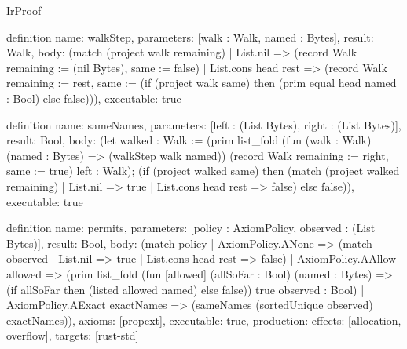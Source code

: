 \begin{lexlean}{IrProof}
\begin{semanticmodule}
definition{
  name: walkStep,
  parameters: [walk : Walk, named : Bytes],
  result: Walk,
  body: (match (project walk remaining)
    | List.nil => (record Walk {remaining := (nil Bytes), same := false})
    | List.cons head rest => (record Walk {remaining := rest, same := (if (project walk same) then (prim equal head named : Bool) else false)})),
  executable: true
}

definition{
  name: sameNames,
  parameters: [left : (List Bytes), right : (List Bytes)],
  result: Bool,
  body: (let walked : Walk := (prim list_fold (fun (walk : Walk) (named : Bytes) => (walkStep walk named)) (record Walk {remaining := right, same := true}) left : Walk); (if (project walked same) then (match (project walked remaining)
    | List.nil => true
    | List.cons head rest => false) else false)),
  executable: true
}

definition{
  name: permits,
  parameters: [policy : AxiomPolicy, observed : (List Bytes)],
  result: Bool,
  body: (match policy
    | AxiomPolicy.ANone => (match observed | List.nil => true | List.cons head rest => false)
    | AxiomPolicy.AAllow allowed => (prim list_fold (fun [allowed] (allSoFar : Bool) (named : Bytes) => (if allSoFar then (listed allowed named) else false)) true observed : Bool)
    | AxiomPolicy.AExact exactNames => (sameNames (sortedUnique observed) exactNames)),
  axioms: [propext],
  executable: true,
  production: {effects: [allocation, overflow], targets: [rust-std]}
}
\end{semanticmodule}
\end{lexlean}
